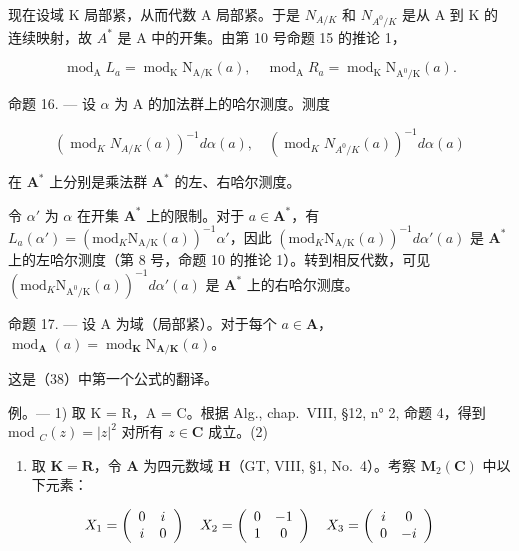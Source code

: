 现在设域 K 局部紧，从而代数 A 局部紧。于是 \(N_{A/K}\) 和 \(N_{A^{0}/K}\) 是从 A 到 K 的连续映射，故 \(A^{*}\) 是 A 中的开集。由第 10 号命题 15 的推论 1，

\[
\operatorname{mod} _ {\mathrm{A}} L _ {a} = \operatorname{mod} _ {\mathrm{K}} \mathrm{N} _ {\mathrm{A} / \mathrm{K}} (a), \quad \operatorname{mod} _ {\mathrm{A}} R _ {a} = \operatorname{mod} _ {\mathrm{K}} \mathrm{N} _ {\mathrm{A} ^ {0} / \mathrm{K}} (a).\tag{38}
\]

命题 16. --- 设 \(\alpha\) 为 A 的加法群上的哈尔测度。测度

\[
\left(\operatorname{mod} _ {K} N _ {A / K} (a)\right) ^ {- 1} d \alpha (a), \quad \left(\operatorname{mod} _ {K} N _ {A ^ {0} / K} (a)\right) ^ {- 1} d \alpha (a)
\]

在 \(\mathbf{A}^*\) 上分别是乘法群 \(\mathbf{A}^*\) 的左、右哈尔测度。

令 \(\alpha'\) 为 \(\alpha\) 在开集 \(\mathbf{A}^*\) 上的限制。对于 \(a \in \mathbf{A}^*\)，有 \(L_a(\alpha') = (\mathrm{mod}_K \mathrm{N}_{\mathrm{A}/\mathrm{K}}(a))^{-1} \alpha'\)，因此 \((\mathrm{mod}_K \mathrm{N}_{\mathrm{A}/\mathrm{K}}(a))^{-1} d\alpha'(a)\) 是 \(\mathbf{A}^*\) 上的左哈尔测度（第 8 号，命题 10 的推论 1）。转到相反代数，可见 \((\mathrm{mod}_K \mathrm{N}_{\mathrm{A}^0/\mathrm{K}}(a))^{-1} d\alpha'(a)\) 是 \(\mathbf{A}^*\) 上的右哈尔测度。

命题 17. --- 设 A 为域（局部紧）。对于每个 \(a \in \mathbf{A}\)，\(\operatorname{mod}_{\mathbf{A}}(a) = \operatorname{mod}_{\mathbf{K}} \mathrm{N}_{\mathbf{A}/\mathbf{K}}(a)\)。

这是（38）中第一个公式的翻译。

例。--- 1) 取 K = R，A = C。根据 Alg., chap.~VIII, §12, n° 2, 命题 4，得到 mod \(_{C}(z) = |z|^{2}\) 对所有 \(z \in \mathbf{C}\) 成立。(2)

\begin{enumerate}
\def\labelenumi{\arabic{enumi})}
\setcounter{enumi}{1}
\tightlist
\item
  取 \(\mathbf{K} = \mathbf{R}\)，令 \(\mathbf{A}\) 为四元数域 \(\mathbf{H}\)（GT, VIII, §1, No.~4）。考察 \(\mathbf{M}_2(\mathbf{C})\) 中以下元素：
\end{enumerate}

\[
X _ {1} = \left( \begin{array}{c c} 0 & i \\ i & 0 \end{array} \right) \quad X _ {2} = \left( \begin{array}{c c} 0 & - 1 \\ 1 & 0 \end{array} \right) \quad X _ {3} = \left( \begin{array}{c c} i & 0 \\ 0 & - i \end{array} \right)
\]

